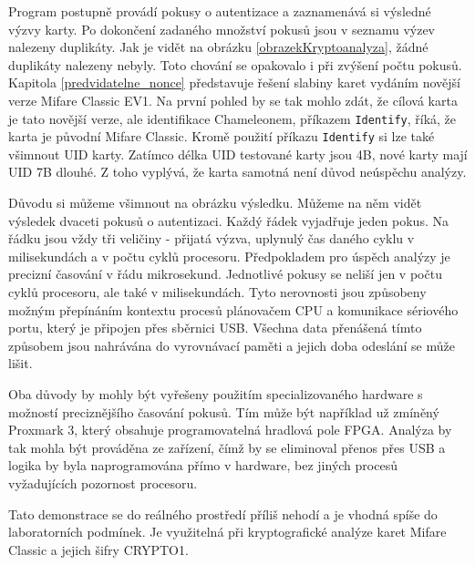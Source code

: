 Program postupně provádí pokusy o autentizace a zaznamenává si výsledné výzvy karty. Po dokončení zadaného množství pokusů jsou v seznamu výzev nalezeny duplikáty. Jak je vidět na obrázku \ref{obrazekKryptoanalyza}, žádné duplikáty nalezeny nebyly. Toto chování se opakovalo i při zvýšení počtu pokusů. Kapitola \ref{predvidatelne_nonce} představuje řešení slabiny karet vydáním novější verze Mifare Classic EV1. Na první pohled by se tak mohlo zdát, že cílová karta je tato novější verze, ale identifikace Chameleonem, příkazem \verb|Identify|, říká, že karta je původní Mifare Classic. Kromě použití příkazu \verb|Identify| si lze také všimnout UID karty. Zatímco délka UID testované karty jsou 4B, nové karty mají UID 7B dlouhé\cite{Mifare_Classic_Official_about}. Z toho vyplývá, že karta samotná není důvod neúspěchu analýzy.\par
Důvodu si můžeme všimnout na obrázku výsledku. Můžeme na něm vidět výsledek dvaceti pokusů o autentizaci. Každý řádek vyjadřuje jeden pokus. Na řádku jsou vždy tři veličiny - přijatá výzva, uplynulý čas daného cyklu v milisekundách a v počtu cyklů procesoru. Předpokladem pro úspěch analýzy je precizní časování v řádu mikrosekund. Jednotlivé pokusy se neliší jen v počtu cyklů procesoru, ale také v milisekundách. Tyto nerovnosti jsou způsobeny možným přepínáním kontextu procesů plánovačem CPU a komunikace sériového portu, který je připojen přes sběrnici USB. Všechna data přenášená tímto způsobem jsou nahrávána do vyrovnávací paměti a jejich doba odeslání se může lišit\cite{RelayUtokBP}.\par
Oba důvody by mohly být vyřešeny použitím specializovaného hardware s možností preciznějšího časování pokusů. Tím může být například už zmíněný Proxmark 3, který obsahuje programovatelná hradlová pole FPGA\cite{Proxmark}. Analýza by tak mohla být prováděna ze zařízení, čímž by se eliminoval přenos přes USB a logika by byla naprogramována přímo v hardware, bez jiných procesů vyžadujících pozornost procesoru. \par
Tato demonstrace se do reálného prostředí příliš nehodí a je vhodná spíše do laboratorních podmínek. Je využitelná při kryptografické analýze karet Mifare Classic a jejich šifry CRYPTO1. 

